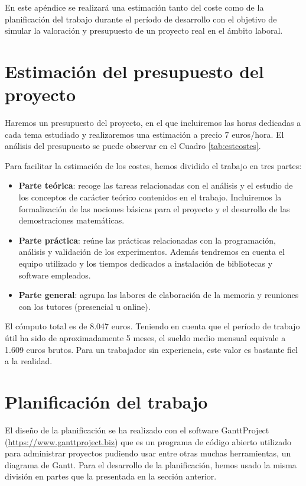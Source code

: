 En este apéndice se realizará una estimación tanto del coste como de la planificación del trabajo durante el período de desarrollo con el objetivo de simular la valoración y presupuesto de un proyecto real en el ámbito laboral.

\section*{Estimación del presupuesto del proyecto}

Haremos un presupuesto del proyecto, en el que incluiremos las horas dedicadas a cada tema estudiado y realizaremos una estimación a precio 7 euros/hora. El análisis del presupuesto se puede observar en el Cuadro \ref{tab:estcostes}.

Para facilitar la estimación de los costes, hemos dividido el trabajo en tres partes:

\begin{itemize}
    \item \textbf{Parte teórica}: recoge las tareas relacionadas con el análisis y el estudio de los conceptos de carácter teórico contenidos en el trabajo. Incluiremos la formalización de las nociones básicas para el proyecto y el desarrollo de las demostraciones matemáticas.
    \item \textbf{Parte práctica}: reúne las prácticas relacionadas con la programación, análisis y validación de los experimentos. Además tendremos en cuenta el equipo utilizado y los tiempos dedicados a instalación de bibliotecas y software empleados.
    \item \textbf{Parte general}: agrupa las labores de elaboración de la memoria y reuniones con los tutores (presencial u online).
\end{itemize}

El cómputo total es de 8.047 euros. Teniendo en cuenta que el período de trabajo útil ha sido de aproximadamente 5 meses, el sueldo medio mensual equivale a 1.609 euros brutos. Para un trabajador sin experiencia, este valor es bastante fiel a la realidad.

\section*{Planificación del trabajo}

El diseño de la planificación se ha realizado con el software GanttProject (\url{https://www.ganttproject.biz}) que es un programa de código abierto utilizado para administrar proyectos pudiendo usar entre otras muchas herramientas, un diagrama de Gantt. Para el desarrollo de la planificación, hemos usado la misma división en partes que la presentada en la sección anterior.

